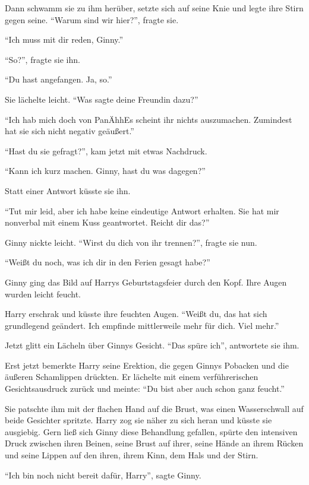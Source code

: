Dann schwamm sie zu ihm herüber, setzte sich auf seine Knie und legte ihre Stirn gegen seine. \enquote{Warum sind wir hier?}, fragte sie.

\enquote{Ich muss mit dir reden, Ginny.}

\enquote{So?}, fragte sie ihn.

\enquote{Du hast angefangen. \gst Ja, so.}

Sie lächelte leicht. \enquote{Was sagte deine Freundin dazu?}

\enquote{Ich hab mich doch von Pan\aabs Ähh\abs Es scheint ihr nichts auszumachen. Zumindest hat sie sich nicht negativ geäußert.}

\enquote{Hast du sie gefragt?}, kam jetzt mit etwas Nachdruck.

\enquote{Kann ich kurz machen. \gst Ginny, hast du was dagegen?}

Statt einer Antwort küsste sie ihn.

\enquote{Tut mir leid, aber ich habe keine eindeutige Antwort erhalten. Sie hat mir nonverbal mit einem Kuss geantwortet. Reicht dir das?}

Ginny nickte leicht. \enquote{Wirst du dich von ihr trennen?}, fragte sie nun.

\enquote{Weißt du noch, was ich dir in den Ferien gesagt habe?}

Ginny ging das Bild auf Harrys Geburtstagsfeier durch den Kopf. Ihre Augen wurden leicht feucht.

Harry erschrak und küsste ihre feuchten Augen. \enquote{Weißt du, das hat sich grundlegend geändert. Ich empfinde mittlerweile mehr für dich. \gst Viel mehr.}

Jetzt glitt ein Lächeln über Ginnys Gesicht. \enquote{Das spüre ich}, antwortete sie ihm.

Erst jetzt bemerkte Harry seine Erektion, die gegen Ginnys Pobacken und die äußeren Schamlippen drückten. Er lächelte mit einem verführerischen Gesichtsausdruck zurück und meinte: \enquote{Du bist aber auch schon ganz feucht.}

Sie patschte ihm mit der flachen Hand auf die Brust, was einen Wasserschwall auf beide Gesichter spritzte. Harry zog sie näher zu sich heran und küsste sie ausgiebig. Gern ließ sich Ginny diese Behandlung gefallen, spürte den intensiven Druck zwischen ihren Beinen, seine Brust auf ihrer, seine Hände an ihrem Rücken und seine Lippen auf den ihren, ihrem Kinn, dem Hals und der Stirn.

\enquote{Ich bin noch nicht bereit dafür, Harry}, sagte Ginny.

